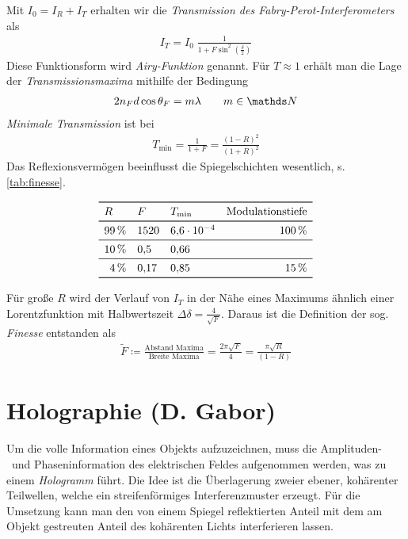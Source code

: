Mit $I_0=I_R+I_T$ erhalten wir die \emph{Transmission des
Fabry-Perot-Interferometers} als
\begin{gather*} 
I_T = I_0\;\frac{1}{1+F\sin^2\left( \frac{\delta}{2} \right)}
\end{gather*}
Diese Funktionsform wird \emph{Airy-Funktion}
genannt.
Für $T\approx 1$ erhält man die Lage der \emph{Transmissionsmaxima} mithilfe
der Bedingung
\begin{gather*}
  2n_Fd\cos\theta_F = m\lambda \qquad m\in\N
\end{gather*}
\emph{Minimale Transmission} ist bei
\begin{gather*}
  T_\text{min} = \frac{1}{1+F} = \frac{(1-R)^2}{(1+R)^2}
\end{gather*}
Das Reflexionsvermögen beeinflusst die Spiegelschichten wesentlich,
s.\,\autoref{tab:finesse}.
\begin{table}
\centering
{}
\begin{equation*}
\begin{array}{ r l l r }
  \toprule
  \multicolumn{1}{l}{R} & F & T_\text{min} & \multicolumn{1}{l}{\text{Modulationstiefe}}\\
  \midrule[\heavyrulewidth]
  \SI{99}{\percent} & \num{1520} & \num{6.6e-4} & \SI{100}{\percent}\\
  \midrule
  \SI{10}{\percent} & \num{0.5} & \num{0.66} & \\
  \midrule
  \SI{4}{\percent} & \num{0.17} & \num{0.85} & \SI{15}{\percent}\\
  \bottomrule
\end{array}
\end{equation*}
\end{table}
Für große $R$ wird der Verlauf von $I_T$ in der Nähe eines Maximums
ähnlich einer Lorentzfunktion mit Halbwertszeit 
$\Delta\delta=\frac{4}{\sqrt{F}}$.
Daraus ist die Definition der sog. \emph{Finesse}
entstanden als
\begin{gather*}
  \widetilde F 
  \coloneqq \frac{\text{Abstand Maxima}}{\text{Breite Maxima}} 
  = \frac{2\pi\sqrt{F}}{4}
  = \frac{\pi\sqrt{R}}{(1-R)}
\end{gather*}%

\section[Holographie]{Holographie (D. Gabor)}
Um die volle Information eines Objekts aufzuzeichnen, muss die
Amplituden-~und Phaseninformation des elektrischen Feldes aufgenommen
werden, was zu einem \emph{Hologramm} führt.
Die Idee ist die Überlagerung zweier ebener, kohärenter Teilwellen,
welche ein streifenförmiges Interferenzmuster erzeugt.
Für die Umsetzung kann man den von einem Spiegel reflektierten Anteil
mit dem am Objekt gestreuten Anteil des kohärenten Lichts
interferieren lassen.

